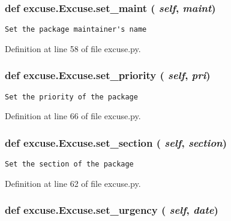 \subsubsection{\setlength{\rightskip}{0pt plus 5cm}def excuse.Excuse.set\_\-maint ( {\em self},  {\em maint})}\label{classexcuse_1_1Excuse_189ec1709eef0bd8acb9cd093b8350b5}




\footnotesize\begin{verbatim}Set the package maintainer's name\end{verbatim}
\normalsize
 

Definition at line 58 of file excuse.py.
\subsubsection{\setlength{\rightskip}{0pt plus 5cm}def excuse.Excuse.set\_\-priority ( {\em self},  {\em pri})}\label{classexcuse_1_1Excuse_3a0ebe3eb87c1af8f093e80a874ea0fa}




\footnotesize\begin{verbatim}Set the priority of the package\end{verbatim}
\normalsize
 

Definition at line 66 of file excuse.py.
\subsubsection{\setlength{\rightskip}{0pt plus 5cm}def excuse.Excuse.set\_\-section ( {\em self},  {\em section})}\label{classexcuse_1_1Excuse_6b435fa4d19b929d9fb70c8d28688387}




\footnotesize\begin{verbatim}Set the section of the package\end{verbatim}
\normalsize
 

Definition at line 62 of file excuse.py.
\subsubsection{\setlength{\rightskip}{0pt plus 5cm}def excuse.Excuse.set\_\-urgency ( {\em self},  {\em date})}\label{classexcuse_1_1Excuse_c504d40ac6d07ffdb08b7ff8ed555d10}




